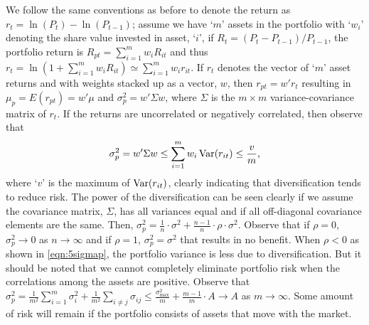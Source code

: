 We follow the same conventions as before to denote the return as $r_t= \ln(P_t) - \ln(P_{t-1})$; assume we have `$m$' assets in the portfolio with `$w_i$' denoting the share value invested in asset, `$i$', if $R_t=(P_t-P_{t-1})/P_{t-1}$, the portfolio return is $R_{pt}= \sum_{i=1}^m w_i R_{it}$ and thus $r_t= \ln \left(1+\sum_{i=1}^m w_i R_{it} \right) \simeq \sum_{i=1}^m w_i r_{it}$. If $r_t$ denotes the vector of `$m$' asset returns and with weights stacked up as a vector, $w$, then $r_{pt}= w' r_t$ resulting in $\mu_p= E(r_{pt})= w' \mu$ and $\sigma_p^2= w' \Sigma w$, where $\Sigma$ is the $m \times m$ variance-covariance matrix of $r_t$. If the returns are uncorrelated or negatively correlated, then observe that
	\begin{equation} \label{eqn:5sigmap}
	\sigma_p^2= w' \Sigma w \leq \sum_{i=1}^m w_i \var(r_{it}) \leq \dfrac{v}{m},
	\end{equation}
where `$v$' is the maximum of $\operatorname{Var}(r_{it})$, clearly indicating that diversification tends to reduce risk. The power of the diversification can be seen clearly if we assume the covariance matrix, $\Sigma$, has all variances equal and if all off-diagonal covariance elements are the same. Then, $\sigma_p^2= \frac{1}{n} \cdot \sigma^2 + \frac{n-1}{n} \cdot \rho \cdot \sigma^2$. Observe that if $\rho= 0$, $\sigma_p^2 \to 0$ as $n \to \infty$ and if $\rho= 1$, $\sigma_p^2= \sigma^2$ that results in no benefit. When $\rho < 0$ as shown in \eqref{eqn:5sigmap}, the portfolio variance is less due to diversification. But it should be noted that we cannot completely eliminate portfolio risk when the correlations among the assets are positive. Observe that $\sigma_p^2= \frac{1}{m^2} \sum_{i=1}^m \sigma_i^2 + \frac{1}{m^2} \sum_{i \neq j} \sigma_{ij} \leq \frac{\sigma_{\text{max}}^2}{m} + \frac{m-1}{m} \cdot A \to A$ as $m \to \infty$. Some amount of risk will remain if the portfolio consists of assets that move with the market. \twomedskip



